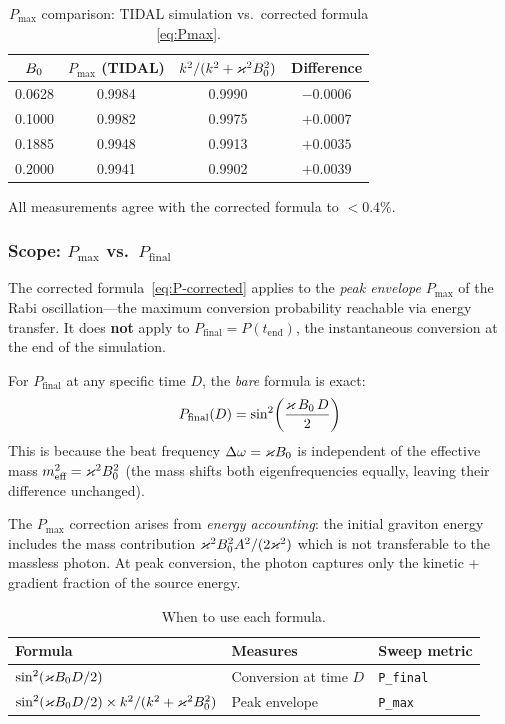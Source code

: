 \begin{table}[htbp]
\centering
\caption{$P_\text{max}$ comparison: TIDAL simulation vs.\ corrected formula \cref{eq:Pmax}.}
\label{tab:Pmax-verification}
\begin{tabular}{@{}cccc@{}}
\toprule
$B_0$ & $P_\text{max}$ (TIDAL) & $k^2/(k^2+\varkappa^2B_0^2)$ & Difference \\
\midrule
0.0628 & 0.9984 & 0.9990 & $-0.0006$ \\
0.1000 & 0.9982 & 0.9975 & $+0.0007$ \\
0.1885 & 0.9948 & 0.9913 & $+0.0035$ \\
0.2000 & 0.9941 & 0.9902 & $+0.0039$ \\
\bottomrule
\end{tabular}
\end{table}

All measurements agree with the corrected formula to $< 0.4\%$.

\subsubsection{Scope: $P_\text{max}$ vs.\ $P_\text{final}$}

The corrected formula~\cref{eq:P-corrected} applies to the \emph{peak envelope}
$P_\text{max}$ of the Rabi oscillation---the maximum conversion probability
reachable via energy transfer.  It does \textbf{not} apply to $P_\text{final}
= P(t_\text{end})$, the instantaneous conversion at the end of the simulation.

For $P_\text{final}$ at any specific time $D$, the \emph{bare} formula is exact:
\begin{equation}
  P_\text{final}(D) = \sin^2\!\left(\frac{\varkappa\,B_0\, D}{2}\right)
  \label{eq:P-final-bare}
\end{equation}
This is because the beat frequency $\Delta\omega = \varkappa B_0$ is independent
of the effective mass $m_\text{eff}^2 = \varkappa^2B_0^2$ (the mass shifts both
eigenfrequencies equally, leaving their difference unchanged).

The $P_\text{max}$ correction arises from \emph{energy accounting}: the initial
graviton energy includes the mass contribution $\varkappa^2B_0^2 A^2/(2\varkappa^2)$
which is not transferable to the massless photon.  At peak conversion, the
photon captures only the kinetic + gradient fraction of the source energy.

\begin{table}[htbp]
\centering
\caption{When to use each formula.}
\label{tab:formula-scope}
\begin{tabular}{@{}lll@{}}
\toprule
Formula & Measures & Sweep metric \\
\midrule
$\sin^2(\varkappa B_0 D/2)$ & Conversion at time $D$ & \texttt{P\_final} \\
$\sin^2(\varkappa B_0 D/2) \times k^2/(k^2 + \varkappa^2B_0^2)$ & Peak envelope & \texttt{P\_max} \\
\bottomrule
\end{tabular}
\end{table}


